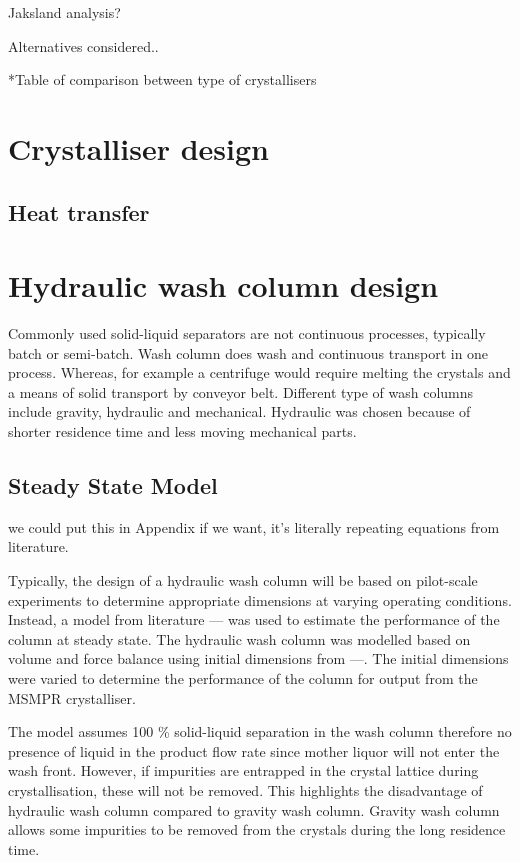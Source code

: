 Jaksland analysis?

Alternatives considered..

*Table of comparison between type of crystallisers

 




\section{Crystalliser design}




\subsection{Heat transfer}










\section{Hydraulic wash column design}

Commonly used solid-liquid separators are not continuous processes, typically batch or semi-batch. Wash column does wash and continuous transport in one process. Whereas, for example a centrifuge would require  melting the crystals and a means of solid transport by conveyor belt. Different type of wash columns include gravity, hydraulic and mechanical. Hydraulic was chosen because of shorter residence time and less moving mechanical parts. 

\subsection{Steady State Model}  \textcolor{red}{}we could put this in Appendix if we want, it's literally repeating equations from literature. 

Typically, the design of a hydraulic wash column will be based on pilot-scale experiments to determine appropriate dimensions at varying operating conditions. Instead, a  model from literature --- was used to estimate the performance of the column at steady state. The hydraulic wash column was modelled based on volume and force balance using initial dimensions from ---. The initial dimensions were varied to determine the performance of the column for output from the MSMPR crystalliser. 

The model assumes 100 \% solid-liquid separation in the wash column therefore no presence of liquid in the product flow rate since mother liquor will not enter the wash front. However, if impurities are entrapped in the crystal lattice during crystallisation, these will not be removed. This highlights the disadvantage of hydraulic wash column compared to gravity wash column. Gravity wash column allows some impurities to be removed from the crystals during the long residence time. 

